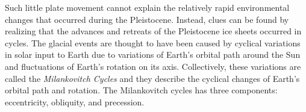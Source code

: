 \documentclass{tufte-handout}
\begin{document}
Such little plate movement cannot explain the relatively rapid environmental changes that occurred during the Pleistocene.  Instead, clues can be found by realizing that the  advances and retreats of the Pleistocene ice sheets occurred in cycles.  The glacial events are thought to have been caused by cyclical variations in solar input to Earth due to variations of Earth's orbital path around the Sun and fluctuations of Earth's rotation on its axis.  Collectively, these variations are called the \textit{Milankovitch Cycles} and they describe the cyclical changes of Earth's orbital path and rotation.  The Milankovitch cycles has three components: eccentricity, obliquity, and precession.
\end{document}
